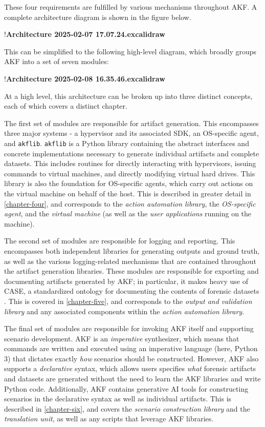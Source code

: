 \documentclass[letterpaper,12pt]{report}
\begin{document}
These four requirements are fulfilled by various mechanisms throughout
AKF. A complete architecture diagram is shown in the figure below.

!\textbf{Architecture 2025-02-07 17.07.24.excalidraw}

This can be simplified to the following high-level diagram, which
broadly groups AKF into a set of seven modules:

!\textbf{Architecture 2025-02-08 16.35.46.excalidraw}

At a high level, this architecture can be broken up into three distinct
concepts, each of which covers a distinct chapter.

The first set of modules are responsible for artifact generation. This
encompasses three major systems - a hypervisor and its associated SDK,
an OS-specific agent, and \texttt{akflib}. \texttt{akflib} is a Python
library containing the abstract interfaces and concrete implementations
necessary to generate individual artifacts and complete datasets. This
includes routines for directly interacting with hypervisors, issuing
commands to virtual machines, and directly modifying virtual hard
drives. This library is also the foundation for OS-specific agents,
which carry out actions on the virtual machine on behalf of the host.
This is described in greater detail in \autoref{chapter-four}, and corresponds to the \emph{action automation library},
the \emph{OS-specific agent}, and the \emph{virtual machine} (as well as
the \emph{user applications} running on the machine).

The second set of modules are responsible for logging and reporting.
This encompasses both independent libraries for generating outputs and
ground truth, as well as the various logging-related mechanisms that are
contained throughout the artifact generation libraries. These modules
are responsible for exporting and documenting artifacts generated by
AKF; in particular, it makes heavy use of CASE, a standardized ontology
for documenting the contents of forensic datasets
\cite{caseyAdvancingCoordinatedCyberinvestigations2017}. This is
covered in \autoref{chapter-five}, and corresponds to the
\emph{output and validation library} and any associated components
within the \emph{action automation library}.

The final set of modules are responsible for invoking AKF itself and
supporting scenario development. AKF is an \emph{imperative}
synthesizer, which means that commands are written and executed using an
imperative language (here, Python 3) that dictates exactly \emph{how}
scenarios should be constructed. However, AKF also supports a
\emph{declarative} syntax, which allows users specifies \emph{what}
forensic artifacts and datasets are generated without the need to learn
the AKF libraries and write Python code. Additionally, AKF contains
generative AI tools for constructing scenarios in the declarative syntax
as well as individual artifacts. This is described in \autoref{chapter-six}, and covers the \emph{scenario construction library}
and the \emph{translation unit}, as well as any scripts that leverage
AKF libraries.
\end{document}
